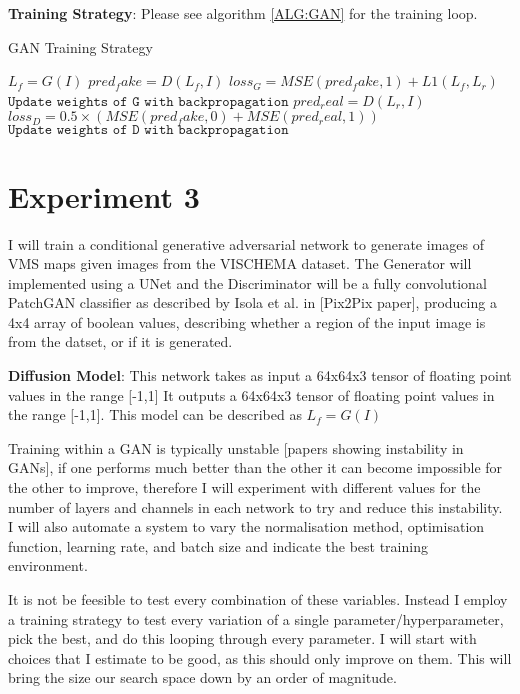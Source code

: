 \documentclass{UoYCSproject}
\begin{document}
\textbf{Training Strategy}: Please see algorithm \ref{ALG:GAN} for the training loop.

\begin{algorithm}
\caption{GAN Training Strategy}\label{ALG:GAN}
\begin{algorithmic}[1]
\State
\State $L_{f} = G(I)$
\State
\State $pred_fake = D(L_{f}, I) $
\State $loss_G = MSE( pred_fake, 1 ) + L1(L_{f}, L_{r}) $
\State $\texttt{Update weights of G with backpropagation}$
\State
\State $pred_real = D(L_{r}, I)$
\State $loss_D = 0.5 \times  ( MSE( pred_fake, 0) + MSE( pred_real, 1) ) $
\State $\texttt{Update weights of D with backpropagation}$
\State
\EndFor
\end{algorithmic}
\end{algorithm}

\section{Experiment 3}

I will train a conditional generative adversarial network to generate images of VMS maps given images from the VISCHEMA dataset. The Generator will implemented using a UNet and the Discriminator will be a fully convolutional PatchGAN classifier as described by Isola et al. in [Pix2Pix paper], producing a 4x4 array of boolean values, describing whether a region of the input image is from the datset, or if it is generated.

\textbf{Diffusion Model}: This network takes as input a 64x64x3 tensor of floating point values in the range [-1,1]
It outputs a 64x64x3 tensor of floating point values in the range [-1,1].
This model can be described as $ L_{f} = G(I) $

Training within a GAN is typically unstable [papers showing instability in GANs], if one performs much better than the other it can become impossible for the other to improve, therefore I will experiment with different values for the number of layers and channels in each network to try and reduce this instability. I will also automate a system to vary the normalisation method, optimisation function, learning rate, and batch size and indicate the best training environment.

It is not be feesible to test every combination of these variables. Instead I employ a training strategy to test every variation of a single parameter/hyperparameter, pick the best, and do this looping through every parameter. I will start with choices that I estimate to be good, as this should only improve on them. This will bring the size our search space down by an order of magnitude.  
\end{document}
